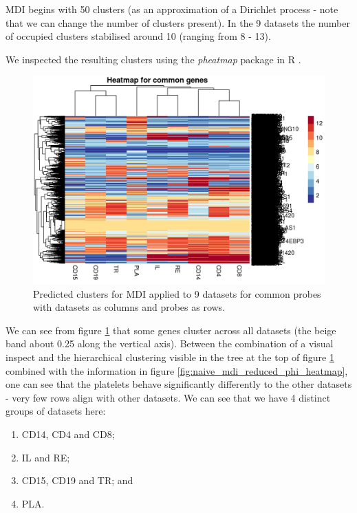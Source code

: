 \documentclass[12pt]{article} %
\begin{document}
	MDI begins with 50 clusters (as an approximation of a Dirichlet process - note that we can change the number of clusters present). In the 9 datasets the number of occupied clusters stabilised around 10 (ranging from 8 - 13).
	
	We inspected the resulting clusters using the \emph{pheatmap} package \cite{kolde2019pheatmap} in R \cite{R2019}.
	
	\begin{figure}[h]
		\includegraphics[scale=1.0]{Images/Initial_analysis/mdi_1_heatmap-1.png}
		\caption{Predicted clusters for MDI applied to 9 datasets for common probes with datasets as columns and probes as rows.}
		\label{fig:naive_mdi_reduced}
	\end{figure}

	We can see from figure \ref{fig:naive_mdi_reduced} that some genes cluster across all datasets (the beige band about 0.25 along the vertical axis). Between the combination of a visual inspect and the hierarchical clustering visible in the tree at the top of figure \ref{fig:naive_mdi_reduced} combined with the information in figure \ref{fig:naive_mdi_reduced_phi_heatmap}, one can see that the platelets behave significantly differently to the other datasets - very few rows align with other datasets. We can see that we have 4 distinct groups of datasets here:
	\begin{enumerate} \label{list:datasets_naive_mdi_reduced}
		\item CD14, CD4 and CD8;
		\item IL and RE;
		\item CD15, CD19 and TR; and
		\item PLA.
	\end{enumerate}
\end{document}
